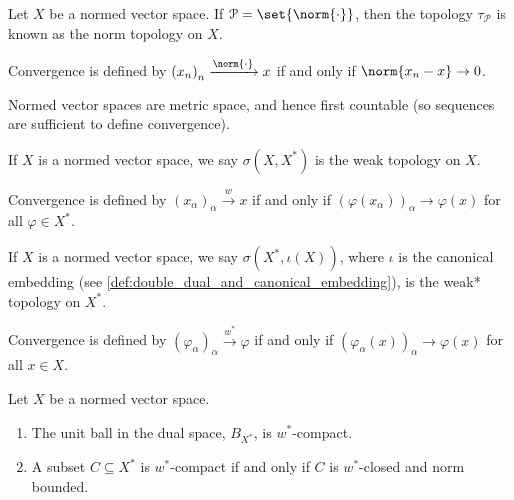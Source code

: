 \begin{definition}\label{def:norm_topology}
  Let $X$ be a normed vector space. If $\mathcal{P} = \set{\norm{\cdot}}$, then the topology $\tau_{\mathcal{P}}$ is known as the norm topology on $X$.\newline

  Convergence is defined by $\left(x_n\right)_n\xrightarrow{\norm{\cdot}}x$ if and only if $\norm{x_n - x}\rightarrow 0$.
\end{definition}
\begin{remark}
  Normed vector spaces are metric space, and hence first countable (so sequences are sufficient to define convergence).
\end{remark}
\begin{definition}\label{def:weak_topology}
  If $X$ is a normed vector space, we say $\sigma\left(X,X^{\ast}\right)$ is the weak topology on $X$.\newline

  Convergence is defined by $\left(x_\alpha\right)_\alpha\xrightarrow{w}x$ if and only if $\left(\varphi\left(x_\alpha\right)\right)_\alpha\rightarrow \varphi\left(x\right)$ for all $\varphi\in X^{\ast}$.
\end{definition}
\begin{definition}\label{def:weak_star_topology}
  If $X$ is a normed vector space, we say $\sigma\left(X^{\ast},\iota(X)\right)$, where $\iota$ is the canonical embedding (see \ref{def:double_dual_and_canonical_embedding}), is the weak* topology on $X^{\ast}$.\newline

  Convergence is defined by $\left(\varphi_{\alpha}\right)_\alpha\xrightarrow{w^{\ast}} \varphi$ if and only if $\left(\varphi_{\alpha}(x)\right)_{\alpha}\rightarrow \varphi(x)$ for all $x\in X$.
\end{definition}
\begin{theorem}\label{thm:banach_alaoglu}
  Let $X$ be a normed vector space. 
  \begin{enumerate}[(1)]
    \item The unit ball in the dual space, $B_{X^{\ast}}$, is $w^{\ast}$-compact.
    \item A subset $C\subseteq X^{\ast}$ is $w^{\ast}$-compact if and only if $C$ is $w^{\ast}$-closed and norm bounded.
  \end{enumerate}
\end{theorem}
